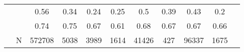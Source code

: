\begin{table}[ht]
\begin{tabular}{l>{\raggedright\arraybackslash}p{3.2cm}|ccccccccc}
   & \multicolumn{1}{>{\raggedleft\arraybackslash}p{2.9cm}|}{\makebox[2.9cm][r]{Lives with Child }} & 0.56 & 0.34 & 0.24 & 0.25 & 0.5 & 0.39 & 0.43 & 0.2 \\ 
   & \multicolumn{1}{>{\raggedleft\arraybackslash}p{3.4cm}|}{\makebox[3.4cm][r]{Married/Cohabiting }} & 0.74 & 0.75 & 0.67 & 0.61 & 0.68 & 0.67 & 0.67 & 0.66 \\ 
   & N & 572708 & 5038 & 3989 & 1614 & 41426 & 427 & 96337 & 1675 \\ 
   \hline
\end{tabular}
\endgroup
\end{table}
